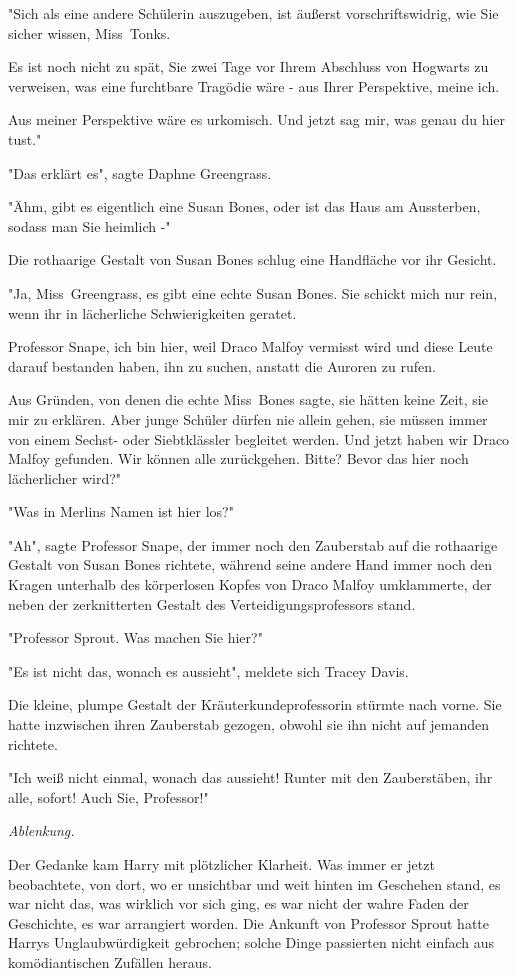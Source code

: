 {"Sich als eine andere Schülerin auszugeben, ist äußerst vorschriftswidrig, wie Sie sicher wissen, Miss~Tonks.

Es ist noch nicht zu spät, Sie zwei Tage vor Ihrem Abschluss von Hogwarts zu verweisen, was eine furchtbare Tragödie wäre - aus Ihrer Perspektive, meine ich.

Aus meiner Perspektive wäre es urkomisch. Und jetzt sag mir, was genau du hier tust."

"Das erklärt es", sagte Daphne Greengrass.

"Ähm, gibt es eigentlich eine Susan Bones, oder ist das Haus am Aussterben, sodass man Sie heimlich -"

Die rothaarige Gestalt von Susan Bones schlug eine Handfläche vor ihr Gesicht.

"Ja, Miss~Greengrass, es gibt eine echte Susan Bones. Sie schickt mich nur rein, wenn ihr in lächerliche Schwierigkeiten geratet.

Professor Snape, ich bin hier, weil Draco Malfoy vermisst wird und diese Leute darauf bestanden haben, ihn zu suchen, anstatt die Auroren zu rufen.

Aus Gründen, von denen die echte Miss~Bones sagte, sie hätten keine Zeit, sie mir zu erklären. Aber junge Schüler dürfen nie allein gehen, sie müssen immer von einem Sechst- oder Siebtklässler begleitet werden. Und jetzt haben wir Draco Malfoy gefunden. Wir können alle zurückgehen. Bitte? Bevor das hier noch lächerlicher wird?"

"Was in Merlins Namen ist hier los?"

"Ah", sagte Professor Snape, der immer noch den Zauberstab auf die rothaarige Gestalt von Susan Bones richtete, während seine andere Hand immer noch den Kragen unterhalb des körperlosen Kopfes von Draco Malfoy umklammerte, der neben der zerknitterten Gestalt des Verteidigungsprofessors stand.

"Professor Sprout. Was machen Sie hier?"

"Es ist nicht das, wonach es aussieht", meldete sich Tracey Davis.

Die kleine, plumpe Gestalt der Kräuterkundeprofessorin stürmte nach vorne. Sie hatte inzwischen ihren Zauberstab gezogen, obwohl sie ihn nicht auf jemanden richtete.

"Ich weiß nicht einmal, wonach das aussieht! Runter mit den Zauberstäben, ihr alle, sofort! Auch Sie, Professor!"

\emph{Ablenkung.}

Der Gedanke kam Harry mit plötzlicher Klarheit. Was immer er jetzt beobachtete, von dort, wo er unsichtbar und weit hinten im Geschehen stand, es war nicht das, was wirklich vor sich ging, es war nicht der wahre Faden der Geschichte, es war arrangiert worden. Die Ankunft von Professor Sprout hatte Harrys Unglaubwürdigkeit gebrochen; solche Dinge passierten nicht einfach aus komödiantischen Zufällen heraus.

}
